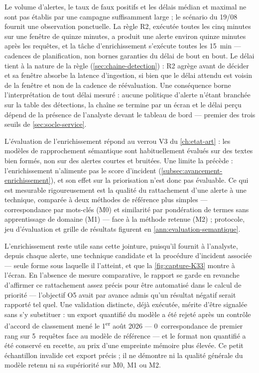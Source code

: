 Le volume d'alertes, le taux de faux positifs et les délais médian et maximal ne sont pas établis
par une campagne suffisamment large ; le scénario du 19/08 fournit une observation ponctuelle. La
règle R2, exécutée toutes les cinq minutes sur une fenêtre de quinze minutes, a produit une alerte
environ quinze minutes après les requêtes, et la tâche d'enrichissement s'exécute toutes les
15~min --- cadences de planification, non bornes garanties du délai de bout en bout. Le délai tient
à la nature de la règle (\cref{sec:chaine-detection}) : R2 agrège avant de décider et sa fenêtre
absorbe la latence d'ingestion, si bien que le délai attendu est voisin de la fenêtre et non de la
cadence de réévaluation. Une conséquence borne l'interprétation de tout délai mesuré : aucune
politique d'alerte n'étant branchée sur la table des détections, la chaîne se termine par un écran
et le délai perçu dépend de la présence de l'analyste devant le tableau de bord --- premier des
trois seuils de \cref{sec:socle-service}.

L'évaluation de l'enrichissement répond au verrou V3 du \cref{ch:etat-art} : les modèles de rapprochement
sémantique sont habituellement évalués sur des textes bien formés, non sur des alertes courtes et
bruitées. Une limite la précède : l'enrichissement n'alimente pas le score d'incident
(\cref{subsec:avancement-enrichissement}), et son effet sur la priorisation n'est donc pas
évaluable. Ce qui est mesurable rigoureusement est la qualité du rattachement d'une alerte à une
technique, comparée à deux méthodes de référence plus simples --- correspondance par mots-clés (M0)
et similarité par pondération de termes sans apprentissage de domaine (M1) --- face à la méthode
retenue (M2) ; protocole, jeu d'évaluation et grille de résultats figurent en
\cref{ann:evaluation-semantique}.

L'enrichissement reste utile sans cette jointure, puisqu'il fournit à l'analyste, depuis chaque
alerte, une technique candidate et la procédure d'incident associée --- seule forme sous laquelle
il l'atteint, et que la \cref{fig:capture-K33} montre à l'écran. En l'absence de mesure
comparative, le rapport se garde en revanche d'affirmer ce rattachement assez précis pour être
automatisé dans le calcul de priorité --- l'objectif O5 avait par avance admis qu'un résultat
négatif serait rapporté tel quel. Une validation distincte, déjà exécutée, mérite d'être signalée
sans s'y substituer : un export quantifié du modèle a été rejeté après un contrôle d'accord de
classement mené le 1\textsuperscript{er} août 2026 --- 0~correspondance de premier rang sur
5~requêtes face au modèle de référence --- et le format non quantifié a été conservé en recette, au
prix d'une empreinte mémoire plus élevée. Ce petit échantillon invalide cet export précis ; il ne
démontre ni la qualité générale du modèle retenu ni sa supériorité sur M0, M1 ou M2.

